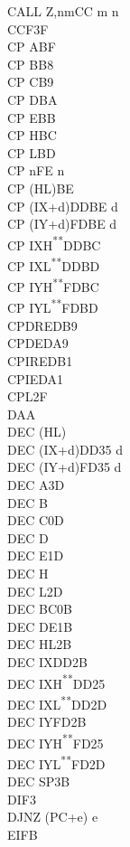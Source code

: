 \documentclass[12pt,twoside,openright,a4paper]{book}
\newcommand{\UNDOC}{\textnormal{\textsuperscript{**}}}
\begin{document}
\begin{multicols}{3}
{\begin{tabbing}
		CALL Z,nm\>CC m n\\
		CCF\>3F\\
		CP A\>BF\\
		CP B\>B8\\
		CP C\>B9\\
		CP D\>BA\\
		CP E\>BB\\
		CP H\>BC\\
		CP L\>BD\\
		CP n\>FE n\\
		CP (HL)\>BE\\
		CP (IX+d)\>DDBE d\\
		CP (IY+d)\>FDBE d\\
		CP IXH\UNDOC\>DDBC\\
		CP IXL\UNDOC\>DDBD\\
		CP IYH\UNDOC\>FDBC\\
		CP IYL\UNDOC\>FDBD\\
		CPDR\>EDB9\\
		CPD\>EDA9\\
		CPIR\>EDB1\\
		CPI\>EDA1\\
		CPL\>2F\\
		DAA\\
		DEC (HL)\\
		DEC (IX+d)\>DD35 d\\
		DEC (IY+d)\>FD35 d\\
		DEC A\>3D\\
		DEC B\\
		DEC C\>0D\\
		DEC D\\
		DEC E\>1D\\
		DEC H\\
		DEC L\>2D\\
		DEC BC\>0B\\
		DEC DE\>1B\\
		DEC HL\>2B\\
		DEC IX\>DD2B\\
		DEC IXH\UNDOC\>DD25\\
		DEC IXL\UNDOC\>DD2D\\
		DEC IY\>FD2B\\
		DEC IYH\UNDOC\>FD25\\
		DEC IYL\UNDOC\>FD2D\\
		DEC SP\>3B\\
		DI\>F3\\
		DJNZ (PC+e) e\\
		EI\>FB\\

\end{tabbing}}
\end{multicols}
\end{document}
